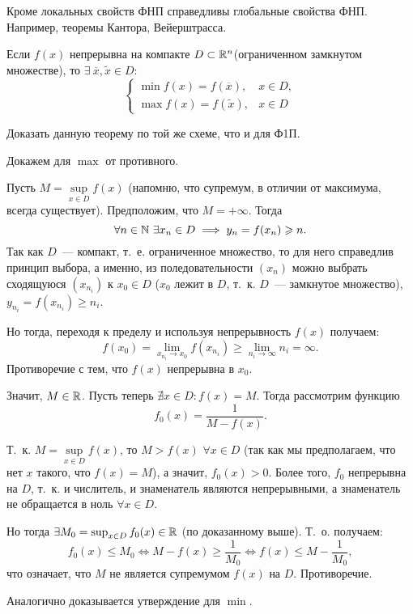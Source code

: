 \documentclass[../../main.tex]{subfiles}
\begin{document}
	Кроме локальных свойств ФНП справедливы глобальные свойства ФНП. Например,
	теоремы Кантора, Вейерштрасса.
	\begin{thm}[Вейерштрасс]
		Если $f(x)$ непрерывна на компакте $D \subset \mathbb{R}^n$(ограниченном 
		замкнутом множестве), то $\exists\ \overline{x}, \widetilde{x} \in D:$
		\[ 
		\begin{cases}
		\min f(x) = f(\overline{x}),& x \in D, \\
		\max f(x) = f(\widetilde{x}),& x \in D
		\end{cases}
		\]
	\end{thm}
	\begin{exc}
		Доказать данную теорему по той же схеме, что и для Ф1П.
	\end{exc}
	\begin{eans}
		Докажем для $\max$ от противного.
		
		Пусть $M = \sup\limits_{x\in D}f(x)$ (напомню, что супремум, в отличии от 
		максимума, всегда существует). 
		Предположим, что $M = +\infty$. Тогда
		\[\forall n\in\mathbb{N}\ \exists x_n\in D\implies y_n = f(x_n) \geqslant n.\]
		Так как $D$~--- компакт, т.~е. ограниченное множество, то для него 
		справедлив принцип выбора, а именно, из поледовательности $(x_n)$ можно 
		выбрать сходящуюся $\left(x_{n_i}\right)$ к $x_0\in D$ ($x_0$ лежит в $D$, 
		т.~к. $D$~--- замкнутое множество), $y_{n_{i}} = f\left(x_{n_{i}}\right) 
		\geq n_{i}$.
		
		Но тогда, переходя к пределу и используя непрерывность $f(x)$ получаем:
		\[f(x_0) = \lim_{x_{n_{i}}\to x_0}f\left(x_{n_i}\right)\geq 
		\lim_{n_i\to\infty}n_i = \infty.\]
		Противоречие с тем, что $f(x)$ непрерывна в $x_0$.
		
		Значит, $M\in \mathbb{R}$. Пусть теперь $\nexists x\in D\colon f(x) = M$. Тогда 
		рассмотрим функцию
		\[f_0(x) = \frac{1}{M - f(x)}.\]
		
		Т.~к. $M = \sup\limits_{x\in D} f(x)$, то $M > f(x)$ $\forall x\in D$ (так 
		как мы предполагаем, что нет $x$ такого, что $f(x) = M$), а значит, $f_0(x) 
		> 0$. Более того, $f_0$ непрерывна на $D$, т.~к. и числитель, и знаменатель 
		являются непрерывными, а знаменатель не обращается в ноль $\forall x\in D$.
		
		Но тогда $\exists M_0 = \sup_{x\in D}f_0(x)\in \mathbb{R}$ (по доказанному выше). 
		Т.~о. получаем:
		\[f_0(x)\leq M_0\iff M - f(x)\geq \frac{1}{M_0}\iff f(x)\leq M - 
		\frac{1}{M_0},\]
		что означает, что $M$ не является супремумом $f(x)$ на $D$. Противоречие.
		
		Аналогично доказывается утверждение для $\min$.
		
	\end{eans}
\end{document}

